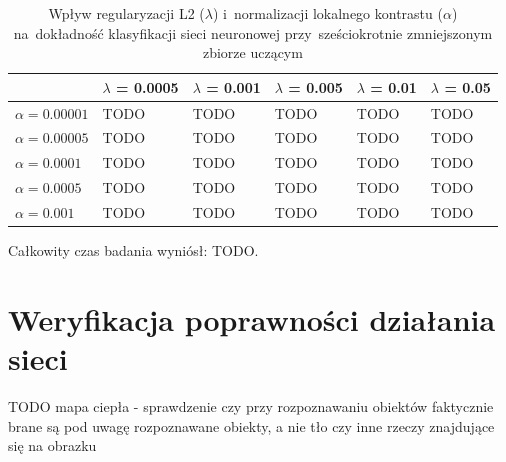 \begin{table}[H]
    \centering
    \begin{tabular}{|l|l|l|l|l|l|}
      \hline
                       & $\lambda$ = 0.0005 & $\lambda$ = 0.001 & $\lambda$ = 0.005 & $\lambda$ = 0.01 & $\lambda$ = 0.05 \\
      \hline
      $\alpha=0.00001$ & TODO & TODO & TODO & TODO & TODO \\
      \hline
      $\alpha=0.00005$ & TODO & TODO & TODO & TODO & TODO \\
      \hline
      $\alpha=0.0001$  & TODO & TODO & TODO & TODO & TODO \\
      \hline
      $\alpha=0.0005$  & TODO & TODO & TODO & TODO & TODO \\
      \hline
      $\alpha=0.001$   & TODO & TODO & TODO & TODO & TODO \\
      \hline
    \end{tabular}
    \caption{Wpływ regularyzacji L2 ($\lambda$) i~normalizacji lokalnego kontrastu ($\alpha$) na~dokładność klasyfikacji
    sieci neuronowej przy~sześciokrotnie zmniejszonym zbiorze uczącym}
    \label{table:wyniki3}
\end{table}

Całkowity czas badania wyniósł: TODO.

%

\section{Weryfikacja poprawności działania sieci} \label{sec:weryfikacja-poprawnosci}
TODO mapa ciepła - sprawdzenie czy przy rozpoznawaniu obiektów faktycznie brane są pod uwagę rozpoznawane obiekty,
a nie tło czy inne rzeczy znajdujące się na obrazku

